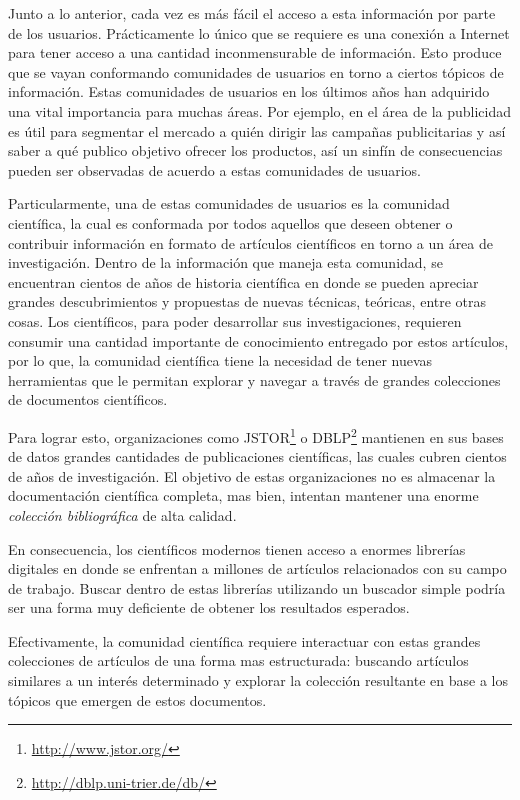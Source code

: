 \documentclass[12pt,oneside,letterpaper]{book}
\theoremstyle{definition}
\begin{document}
Junto a lo anterior, cada vez es más fácil el acceso a esta información por parte de los usuarios. Prácticamente lo único que se requiere es una conexión a Internet para tener acceso a una cantidad inconmensurable de información. Esto produce que se vayan conformando comunidades de usuarios en torno a ciertos tópicos de información. Estas comunidades de usuarios en los últimos años han adquirido una vital importancia para muchas áreas. Por ejemplo, en el área de la publicidad es útil para segmentar el mercado a quién dirigir las campañas publicitarias y así saber a qué publico objetivo ofrecer los productos, así un sinfín de consecuencias pueden ser observadas de acuerdo a estas comunidades de usuarios.

Particularmente, una de estas comunidades de usuarios es la comunidad científica, la cual es conformada por todos aquellos que deseen obtener o contribuir información en formato de artículos científicos en torno a un área de investigación. Dentro de la información que maneja esta comunidad, se encuentran cientos de años de historia científica en donde se pueden apreciar grandes descubrimientos y propuestas de nuevas técnicas, teóricas, entre otras cosas. Los científicos, para poder desarrollar sus investigaciones, requieren consumir una cantidad importante de conocimiento entregado por estos artículos, por lo que, la comunidad científica tiene la necesidad de tener nuevas herramientas que le permitan explorar y navegar a través de grandes colecciones de documentos científicos.

Para lograr esto, organizaciones como JSTOR\footnote{\url{http://www.jstor.org/}} o DBLP\footnote{\url{http://dblp.uni-trier.de/db/}} mantienen en sus bases de datos grandes cantidades de publicaciones científicas, las cuales cubren cientos de años de investigación. El objetivo de estas organizaciones no es almacenar la documentación científica completa, mas bien, intentan mantener una enorme \emph{colección bibliográfica} de alta calidad.

En consecuencia, los científicos modernos tienen acceso a enormes librerías digitales en donde se enfrentan a millones de artículos relacionados con su campo de trabajo. Buscar dentro de estas librerías utilizando un buscador simple podría ser una forma muy deficiente de obtener los resultados esperados.

Efectivamente, la comunidad científica requiere interactuar con estas grandes colecciones de artículos de una forma mas estructurada: buscando artículos similares a un interés determinado y explorar la colección resultante en base a los tópicos que emergen de estos documentos.
\end{document}
